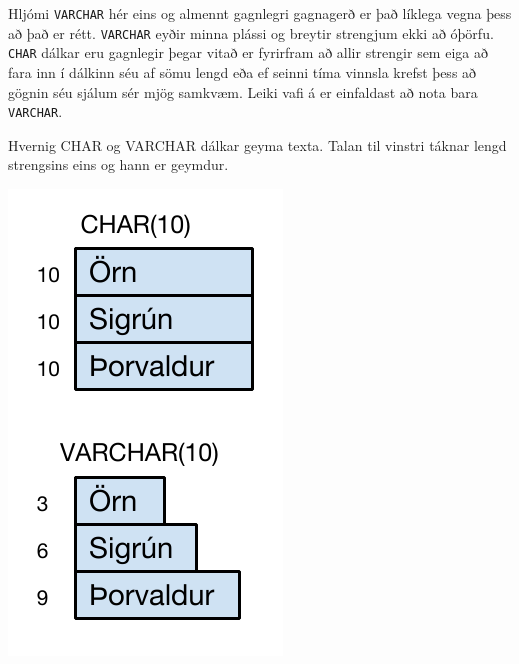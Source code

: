 Hljómi \verb|VARCHAR| hér eins og almennt gagnlegri gagnagerð er það líklega vegna þess að það er rétt. \verb|VARCHAR| eyðir minna plássi og breytir strengjum ekki að óþörfu. \verb|CHAR| dálkar eru gagnlegir þegar vitað er fyrirfram að allir strengir sem eiga að fara inn í dálkinn séu af sömu lengd eða ef seinni tíma vinnsla krefst þess að gögnin séu sjálum sér mjög samkvæm. Leiki vafi á er einfaldast að nota bara \verb|VARCHAR|.
\begin{marginfigure}
\caption[CHAR og VARCHAR]{Hvernig CHAR og VARCHAR dálkar geyma texta. Talan til vinstri táknar lengd strengsins eins og hann er geymdur.}
\label{mynd:char-varchar}
\centering
\includegraphics[width=\linewidth]{myndir/char-varchar}
\end{marginfigure}

